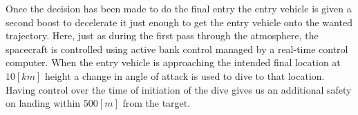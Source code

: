 Once the decision has been made to do the final entry the entry vehicle is given a second boost to decelerate it just enough to get the entry vehicle onto the wanted trajectory. Here, just as during the first pass through the atmosphere, the spacecraft is controlled using active bank control managed by a real-time control computer. When the entry vehicle is approaching the intended final location at $10 \left[km\right]$ height a change in angle of attack is used to dive to that location. Having control over the time of initiation of the dive gives us an additional safety on landing within  $500 \left[m\right]$ from the target.